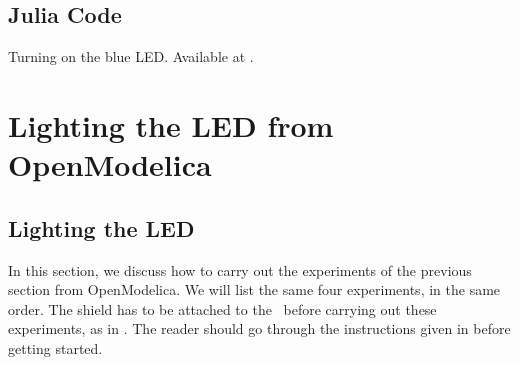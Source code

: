 \subsection{Julia Code}
\lstset{style=mystyle}
\label{sec:led-julia-code}

\begin{juliacode}
  {Turning on the blue LED.  Available at
    .}
  \label{julia:led-blue}
  
\end{juliacode}

\begin{juliacode}
  \label{julia:led-blue-delay}
  
\end{juliacode}

\begin{juliacode}
  \label{julia:led-blue-red}
  
\end{juliacode}

\begin{juliacode}
  \label{julia:led-green-blink}
  
\end{juliacode}



\section{Lighting the LED from OpenModelica}
\subsection{Lighting the LED}
\label{sec:light-OpenModelica}
In this section, we discuss how to carry out the experiments of the
previous section from OpenModelica.  We will list the same four experiments,
in the same order.  The shield has to be attached to the \arduino\
before carrying out these experiments, as in .
The reader should go through the instructions given in
 before getting started.

